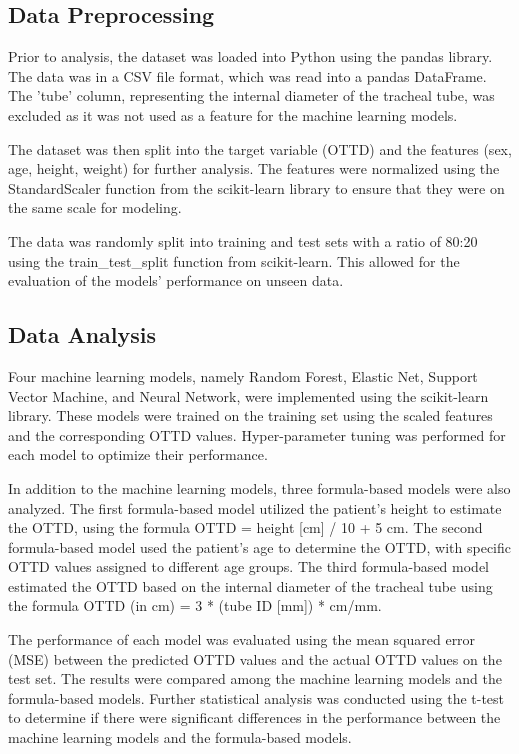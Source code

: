 \documentclass[11pt]{article}
\begin{document}
\subsection*{Data Preprocessing}
Prior to analysis, the dataset was loaded into Python using the pandas library. The data was in a CSV file format, which was read into a pandas DataFrame. The 'tube' column, representing the internal diameter of the tracheal tube, was excluded as it was not used as a feature for the machine learning models.

The dataset was then split into the target variable (OTTD) and the features (sex, age, height, weight) for further analysis. The features were normalized using the StandardScaler function from the scikit-learn library to ensure that they were on the same scale for modeling.

The data was randomly split into training and test sets with a ratio of 80:20 using the train\_test\_split function from scikit-learn. This allowed for the evaluation of the models' performance on unseen data.

\subsection*{Data Analysis}
Four machine learning models, namely Random Forest, Elastic Net, Support Vector Machine, and Neural Network, were implemented using the scikit-learn library. These models were trained on the training set using the scaled features and the corresponding OTTD values. Hyper-parameter tuning was performed for each model to optimize their performance.

In addition to the machine learning models, three formula-based models were also analyzed. The first formula-based model utilized the patient's height to estimate the OTTD, using the formula OTTD = height [cm] / 10 + 5 cm. The second formula-based model used the patient's age to determine the OTTD, with specific OTTD values assigned to different age groups. The third formula-based model estimated the OTTD based on the internal diameter of the tracheal tube using the formula OTTD (in cm) = 3 * (tube ID [mm]) * cm/mm.

The performance of each model was evaluated using the mean squared error (MSE) between the predicted OTTD values and the actual OTTD values on the test set. The results were compared among the machine learning models and the formula-based models. Further statistical analysis was conducted using the t-test to determine if there were significant differences in the performance between the machine learning models and the formula-based models.
\end{document}
